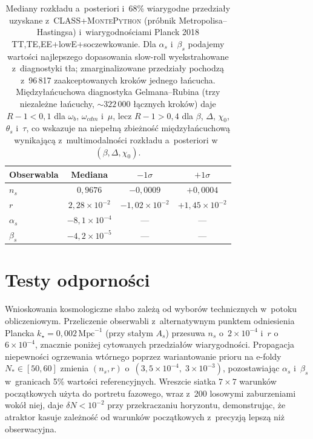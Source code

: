 \documentclass[11pt,a4paper]{article}
\begin{document}
\begin{table}[t]
    \centering
    \caption{Mediany rozkładu a~posteriori i~68\% wiarygodne przedziały uzyskane z~\textsc{CLASS}+\textsc{MontePython} (próbnik Metropolisa--Hastingsa) i~wiarygodnościami Planck 2018 TT,TE,EE+lowE+soczewkowanie. Dla $\alpha_{s}$ i~$\beta_{s}$ podajemy wartości najlepszego dopasowania slow-roll wyekstrahowane z~diagnostyki tła; zmarginalizowane przedziały pochodzą z~96\,817 zaakceptowanych kroków jednego łańcucha. Międzyłańcuchowa diagnostyka Gelmana--Rubina (trzy niezależne łańcuchy, ${\sim}322\,000$ łącznych kroków) daje $R{-}1<0{,}1$ dla $\omega_b$, $\omega_{cdm}$ i~$\mu$, lecz $R{-}1>0{,}4$ dla $\beta$, $\Delta$, $\chi_0$, $\theta_s$ i~$\tau$, co wskazuje na niepełną zbieżność międzyłańcuchową wynikającą z~multimodalności rozkładu a~posteriori w~$(\beta,\Delta,\chi_0)$.}
    \begin{tabular}{lccc}
        \toprule
        Obserwabla & Mediana & $-1\sigma$ & $+1\sigma$ \\
        \midrule
        $n_{s}$ & $0{,}9676$ & $-0{,}0009$ & $+0{,}0004$ \\
        $r$ & $2{,}28\times10^{-2}$ & $-1{,}02\times10^{-2}$ & $+1{,}45\times10^{-2}$ \\
        $\alpha_{s}$ & $-8{,}1\times10^{-4}$ & --- & --- \\
        $\beta_{s}$ & $-4{,}2\times10^{-5}$ & --- & --- \\
        \bottomrule
    \end{tabular}
    \label{tab:observables}
\end{table}

\section{Testy odporności}
\label{sec:robustness}
Wnioskowania kosmologiczne słabo zależą od wyborów technicznych w~potoku obliczeniowym. Przeliczenie obserwabli z~alternatywnym punktem odniesienia Plancka $k_{\star}=0{,}002\,\mathrm{Mpc}^{-1}$ (przy stałym $A_{s}$) przesuwa $n_{s}$ o~$2\times10^{-4}$ i~$r$ o~$6\times10^{-4}$, znacznie poniżej cytowanych przedziałów wiarygodności. Propagacja niepewności ogrzewania wtórnego poprzez wariantowanie prioru na e-foldy $N_{*}\in[50,60]$ zmienia $(n_{s},r)$ o~$(3{,}5\times10^{-4},\;3\times10^{-3})$, pozostawiając $\alpha_{s}$ i~$\beta_{s}$ w~granicach 5\% wartości referencyjnych. Wreszcie siatka $7\times7$ warunków początkowych użyta do portretu fazowego, wraz z~200 losowymi zaburzeniami wokół niej, daje $\delta N<10^{-2}$ przy przekraczaniu horyzontu, demonstrując, że atraktor kasuje zależność od warunków początkowych z~precyzją lepszą niż obserwacyjna.
\end{document}
